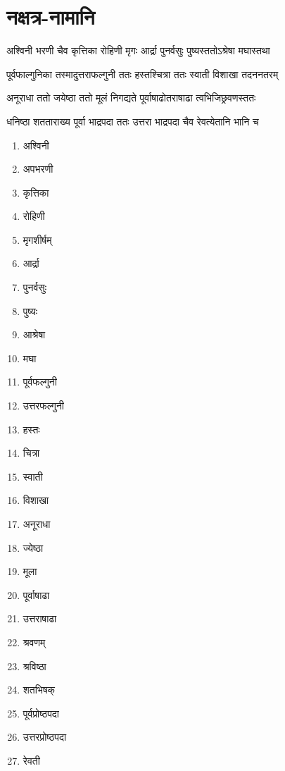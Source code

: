 \chapter{नक्षत्र-नामानि}
\label{app:nakshatra_names}

\twolineshloka
{अश्विनी भरणी चैव कृत्तिका रोहिणी मृगः}
{आर्द्रा पुनर्वसुः पुष्यस्ततोऽश्रेषा मघास्तथा}

\twolineshloka
{पूर्वफाल्गुनिका तस्मादुत्तराफल्गुनी ततः}
{हस्तश्चित्रा ततः स्वाती विशाखा तदननतरम्}

\twolineshloka
{अनूराधा ततो जयेष्ठा ततो मूलं निगद्यते}
{पूर्वाषाढोतराषाढा त्वभिजिछ्रवणस्ततः}

\twolineshloka
{धनिष्ठा शतताराख्य पूर्वा भाद्रपदा ततः}
{उत्तरा भाद्रपदा चैव रेवत्येतानि भानि च}


\begin{multicols}{2}
\begin{enumerate}
\item अश्विनी
\item अपभरणी
\item कृत्तिका
\item रोहिणी
\item मृगशीर्षम्
\item आर्द्रा
\item पुनर्वसुः
\item पुष्यः
\item आश्रेषा
\item मघा
\item पूर्वफल्गुनी
\item उत्तरफल्गुनी
\item हस्तः
\item चित्रा
\item स्वाती
\item विशाखा
\item अनूराधा
\item ज्येष्ठा
\item मूला
\item पूर्वाषाढा
\item उत्तराषाढा
\item श्रवणम्
\item श्रविष्ठा
\item शतभिषक्
\item पूर्वप्रोष्ठपदा
\item उत्तरप्रोष्ठपदा
\item रेवती
\end{enumerate}
\end{multicols}